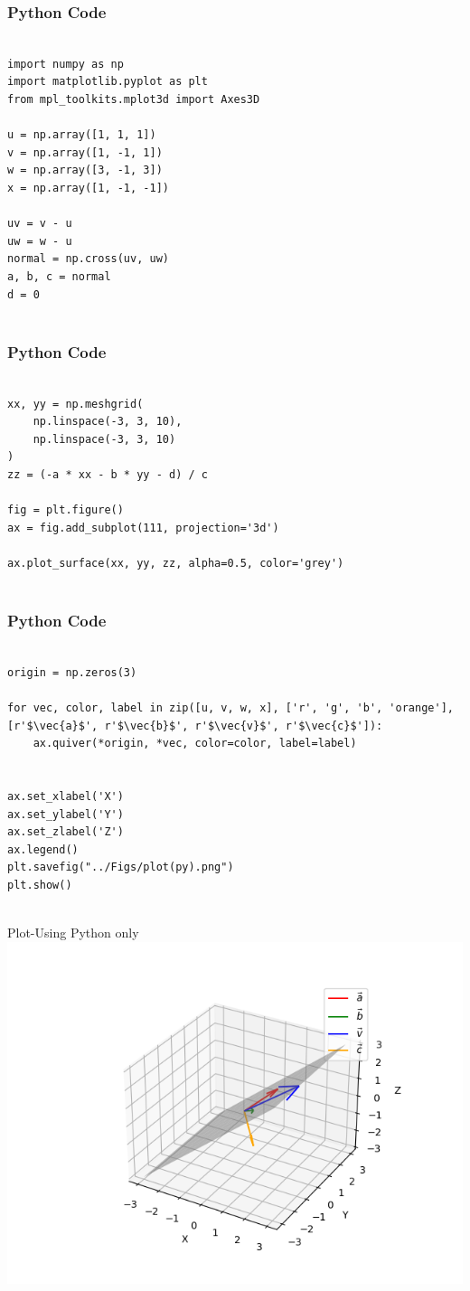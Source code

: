 \documentclass{beamer}
\begin{document}


\begin{frame}[fragile]
    \frametitle{Python Code}
    \begin{lstlisting}

import numpy as np
import matplotlib.pyplot as plt
from mpl_toolkits.mplot3d import Axes3D

u = np.array([1, 1, 1])
v = np.array([1, -1, 1])
w = np.array([3, -1, 3])
x = np.array([1, -1, -1])   

uv = v - u
uw = w - u
normal = np.cross(uv, uw)   
a, b, c = normal
d = 0   


\end{lstlisting}
\end{frame}

\begin{frame}[fragile]
    \frametitle{Python Code}
    \begin{lstlisting}

xx, yy = np.meshgrid(
    np.linspace(-3, 3, 10),
    np.linspace(-3, 3, 10)
)
zz = (-a * xx - b * yy - d) / c

fig = plt.figure()
ax = fig.add_subplot(111, projection='3d')

ax.plot_surface(xx, yy, zz, alpha=0.5, color='grey')


\end{lstlisting}
\end{frame}

\begin{frame}[fragile]
    \frametitle{Python Code}
    \begin{lstlisting}

origin = np.zeros(3)

for vec, color, label in zip([u, v, w, x], ['r', 'g', 'b', 'orange'], [r'$\vec{a}$', r'$\vec{b}$', r'$\vec{v}$', r'$\vec{c}$']):
    ax.quiver(*origin, *vec, color=color, label=label)


ax.set_xlabel('X')
ax.set_ylabel('Y')
ax.set_zlabel('Z')
ax.legend()
plt.savefig("../Figs/plot(py).png")
plt.show()


\end{lstlisting}
\end{frame}


\begin{frame}{Plot-Using Python only}
    \centering
    \includegraphics[width=\columnwidth, height=0.8\textheight, keepaspectratio]{Figs/plot(py).png}     
\end{frame}
\end{document}
